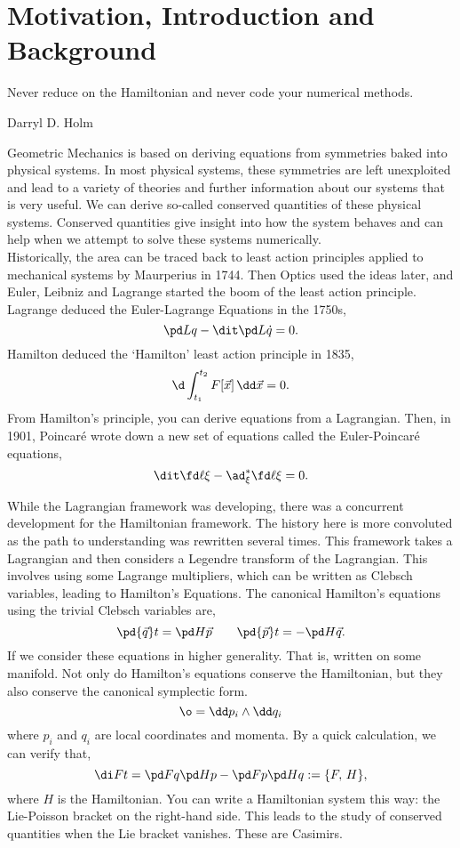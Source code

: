 
\chapter{Motivation, Introduction and Background}
\epigraph{Never reduce on the Hamiltonian and never code your numerical methods.}{Darryl D. Holm}
\noindent
Geometric Mechanics is based on deriving equations from symmetries baked into physical systems. In most physical systems, these symmetries are left unexploited and lead to a variety of theories and further information about our systems that is very useful. We can derive so-called conserved quantities of these physical systems. Conserved quantities give insight into how the system behaves and can help when we attempt to solve these systems numerically. \\

\noindent
Historically, the area can be traced back to least action principles applied to mechanical systems by Maurperius in 1744. Then Optics used the ideas later, and Euler, Leibniz and Lagrange started the boom of the least action principle. Lagrange deduced the Euler-Lagrange Equations in the 1750s,
$$ \pd L q - \dit \pd L {\dot q} = 0. $$
Hamilton deduced the `Hamilton' least action principle in 1835,
$$ \d \int_{t_1}^{t_2} F[\vec x] \, \dd \vec x = 0. $$
From Hamilton's principle, you can derive equations from a Lagrangian. Then, in 1901, Poincar\'e wrote down a new set of equations called the Euler-Poincar\'e equations,
$$ \dit \fd \ell \xi - \ad^*_\xi \fd \ell \xi = 0. $$

\noindent
While the Lagrangian framework was developing, there was a concurrent development for the Hamiltonian framework. The history here is more convoluted as the path to understanding was rewritten several times. This framework takes a Lagrangian and then considers a Legendre transform of the Lagrangian. This involves using some Lagrange multipliers, which can be written as Clebsch variables, leading to Hamilton's Equations. The canonical Hamilton's equations using the trivial Clebsch variables are,
$$ \pd {\vec q} t = \pd H {\vec p} \qquad \pd {\vec p} t = -\pd H {\vec q}. $$
If we consider these equations in higher generality. That is, written on some manifold. Not only do Hamilton's equations conserve the Hamiltonian, but they also conserve the canonical symplectic form.
$$ \o = \dd p_i \wedge \dd q_i $$
where $p_i$ and $q_i$ are local coordinates and momenta. By a quick calculation, we can verify that,
$$ \di F t = \pd F q \pd H p - \pd F p \pd H q := \{F,\, H\}, $$
where $H$ is the Hamiltonian. You can write a Hamiltonian system this way: the Lie-Poisson bracket on the right-hand side. This leads to the study of conserved quantities when the Lie bracket vanishes. These are Casimirs.\\

